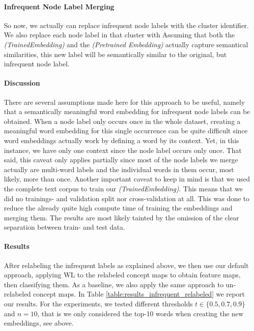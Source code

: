 \paragraph{Infrequent Node Label Merging}
So now, we actually can replace infrequent node labels with the cluster identifier.
We also replace each node label in that cluster with 
Assuming that both the \textit{(TrainedEmbedding)} and the \textit{(Pretrained Embedding)} actually capture semantical similarities, this new label will be semantically similar to the original, but infrequent node label.

\paragraph{Discussion}
There are several assumptions made here for this approach to be useful, namely that a semantically meaningful word embedding for infrequent node labels can be obtained.
When a node label only occurs once in the whole dataset, creating a meaningful word embedding for this single occurrence can be quite difficult since word embeddings actually work by defining a word by its context.
Yet, in this instance, we have only one context since the node label occurs only once.
That said, this caveat only applies partially since most of the node labels we merge actually are multi-word labels and the individual words in them occur, most likely, more than once.
Another important caveat to keep in mind is that we used the complete text corpus to train our \textit{(TrainedEmbedding)}.
This means that we did no trainings- and validation split nor cross-validation at all.
This was done to reduce the already quite high compute time of training the embeddings and merging them.
The results are most likely tainted by the omission of the clear separation between train- and test data.

\paragraph{Results}
After relabeling the infrequent labels as explained above, we then use our default approach, applying WL to the relabeled concept maps to obtain feature maps, then classifying them.
As a baseline, we also apply the same approach to un-relabeled concept maps.
In Table \ref{table:results_infrequent_relabeled} we report our results.
For the experiments, we tested different thresholds $t \in \{0.5, 0.7, 0.9\}$ and $n=10$, that is we only considered the top-10 words when creating the new embeddings, see above.

